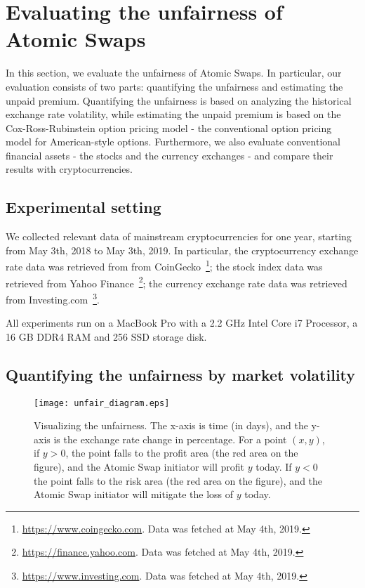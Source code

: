 \section{Evaluating the unfairness of Atomic Swaps}
\label{sec:evaluation}

In this section, we evaluate the unfairness of Atomic Swaps.
In particular, our evaluation consists of two parts: quantifying the unfairness and estimating the unpaid premium.
Quantifying the unfairness is based on analyzing the historical exchange rate volatility, while estimating the unpaid premium is based on the Cox-Ross-Rubinstein option pricing model - the conventional option pricing model for American-style options.
Furthermore, we also evaluate conventional financial assets - the stocks and the currency exchanges - and compare their results with cryptocurrencies.

\subsection{Experimental setting}

We collected relevant data of mainstream cryptocurrencies for one year, starting from May 3th, 2018 to May 3th, 2019.
In particular, the cryptocurrency exchange rate data was retrieved from from CoinGecko~\footnote{\url{https://www.coingecko.com}. Data was fetched at May 4th, 2019.};
the stock index data was retrieved from Yahoo Finance~\footnote{\url{https://finance.yahoo.com}. Data was fetched at May 4th, 2019.};
the currency exchange rate data was retrieved from Investing.com~\footnote{\url{https://www.investing.com}. Data was fetched at May 4th, 2019.}.

All experiments run on a MacBook Pro with a 2.2 GHz Intel Core i7 Processor, a 16 GB DDR4 RAM and 256 SSD storage disk.

\subsection{Quantifying the unfairness by market volatility}
\label{subsec:volatility_analysis}

\begin{figure}
    \texttt{[image: unfair\_diagram.eps]}
    \caption{Visualizing the unfairness. The x-axis is time (in days), and the y-axis is the exchange rate change in percentage. For a point $(x, y)$, if $y > 0$, the point falls to the profit area (the red area on the figure), and the Atomic Swap initiator will profit $y$ today. If $y < 0$ the point falls to the risk area (the red area on the figure), and the Atomic Swap initiator will mitigate the loss of $y$ today.}
    \label{fig:unfair_diagram}
\end{figure}

